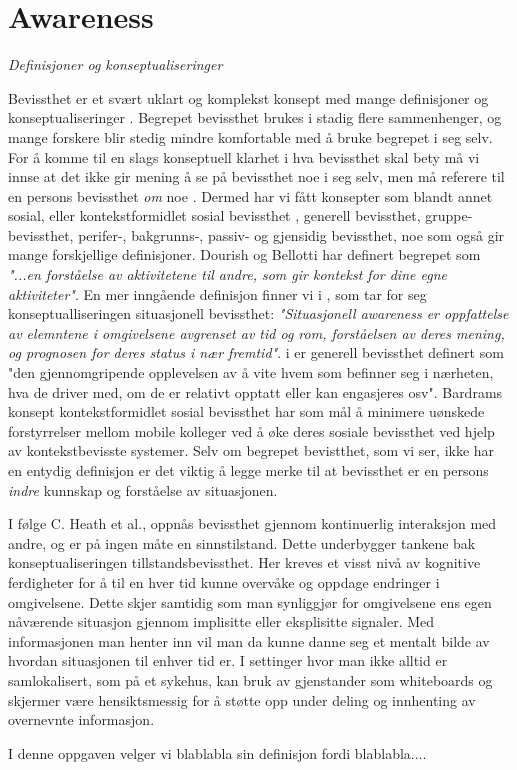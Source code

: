 \section{Awareness}
\label{chp: awareness}

\emph{Definisjoner og konseptualiseringer}

\noindent
Bevissthet er et svært uklart og komplekst konsept med mange definisjoner og konseptualiseringer \cite{KlemetsRedundancy}\cite{Gutwin04}\cite{Schmidt02}. Begrepet bevissthet brukes i stadig flere sammenhenger, og mange forskere blir stedig mindre komfortable med å bruke begrepet i seg selv. For å komme til en slags konseptuell klarhet i hva bevissthet skal bety må vi innse at det ikke gir mening å se på bevissthet noe i seg selv, men må referere til en persons bevissthet \emph{om} noe \cite{Schmidt02}. Dermed har vi fått konsepter som blandt annet sosial, eller kontekstformidlet sosial bevissthet \cite{Bardram04}, generell bevissthet\cite{Gross13}, gruppe-bevissthet\cite{Gutwin04}, perifer-, bakgrunns-, passiv- og gjensidig bevissthet\cite{Schmidt02}, noe som også gir mange forskjellige definisjoner. Dourish og Bellotti har definert begrepet som \emph{"...en forståelse av aktivitetene til andre, som gir kontekst for dine egne aktiviteter"}. En mer inngående definisjon finner vi i \cite{Endsly95}, som tar for seg konseptualliseringen situasjonell bevissthet: \emph{"Situasjonell awareness er oppfattelse av elemntene i omgivelsene avgrenset av tid og rom, forståelsen av deres mening, og prognosen for deres status i nær fremtid"}. i \cite{Gross13} er generell bevissthet definert som "den gjennomgripende opplevelsen av å vite hvem som befinner seg i nærheten, hva de driver med, om de er relativt opptatt eller kan engasjeres osv". Bardrams konsept kontekstformidlet sosial bevissthet har som mål å minimere uønskede forstyrrelser mellom mobile kolleger ved å øke deres sosiale bevissthet ved hjelp av kontekstbevisste systemer\cite{Bardram04}. Selv om begrepet bevistthet, som vi ser, ikke har en entydig definisjon er det viktig å legge merke til at bevissthet er en persons \emph{indre} kunnskap og forståelse av situasjonen.\cite{Gross13} 

\noindent
I følge C. Heath et al., oppnås bevissthet gjennom kontinuerlig interaksjon med andre, og er på ingen måte en sinnstilstand. Dette underbygger tankene bak konseptualiseringen tillstandsbevissthet. Her kreves et visst nivå av kognitive ferdigheter for å til en hver tid kunne overvåke og oppdage endringer i omgivelsene. Dette skjer samtidig som man synliggjør for omgivelsene ens egen nåværende situasjon gjennom implisitte eller eksplisitte signaler. Med informasjonen man henter inn vil man da kunne danne seg et mentalt bilde av hvordan situasjonen til enhver tid er. I settinger hvor man ikke alltid er samlokalisert, som på et sykehus, kan bruk av gjenstander som whiteboards og skjermer være hensiktsmessig for å støtte opp under deling og innhenting av overnevnte informasjon\cite{Bardram04}. 

\noindent
I denne oppgaven velger vi blablabla sin definisjon fordi blablabla....
